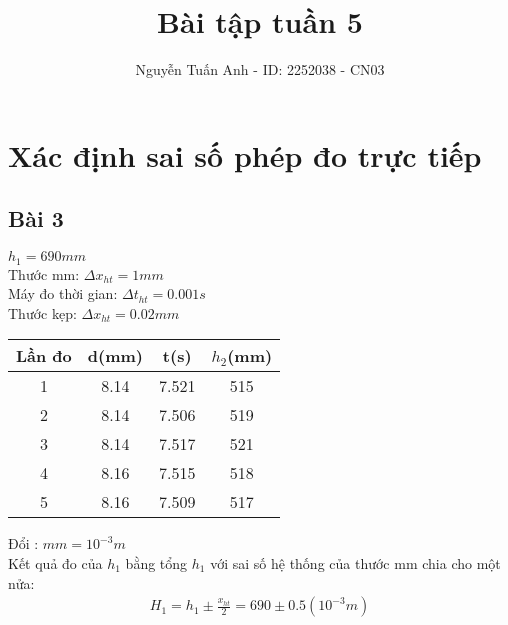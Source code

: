 \documentclass{article}
\title{Bài tập tuần 5}
\author{Nguyễn Tuấn Anh - ID: 2252038 - CN03}
\begin{document}
\maketitle
\section*{Xác định sai số phép đo trực tiếp}
\subsection*{Bài 3}
$h_1 = 690mm$\\ 
Thước mm: $\Delta x_{ht} = 1mm$\\
Máy đo thời gian: $\Delta t_{ht} = 0.001s$\\
Thước kẹp: $\Delta x_{ht} = 0.02mm$\\
\begin{center}
    \begin{tabular}{|c|c|c|c|}
        \hline
        Lần đo & d(mm) & t(s) & $h_2$(mm) \\
        \hline
        1 & 8.14 & 7.521 & 515 \\
        \hline
        2 & 8.14 & 7.506 & 519 \\ 
        \hline
        3 & 8.14 & 7.517 & 521 \\
        \hline
        4 & 8.16 & 7.515 & 518 \\
        \hline
        5 & 8.16 & 7.509 & 517 \\
        \hline
    \end{tabular}
\end{center}
Đổi : $ mm = 10^{-3} m $\\
Kết quả đo của $h_1$ bằng tổng $h_1$ với sai số hệ thống của thước mm chia cho một nửa:
\begin{align*}
    H_1 = h_1 \pm \frac{x_{ht}}{2} = 690 \pm 0.5(10^{-3} m)
\end{align*}
\end{document}
